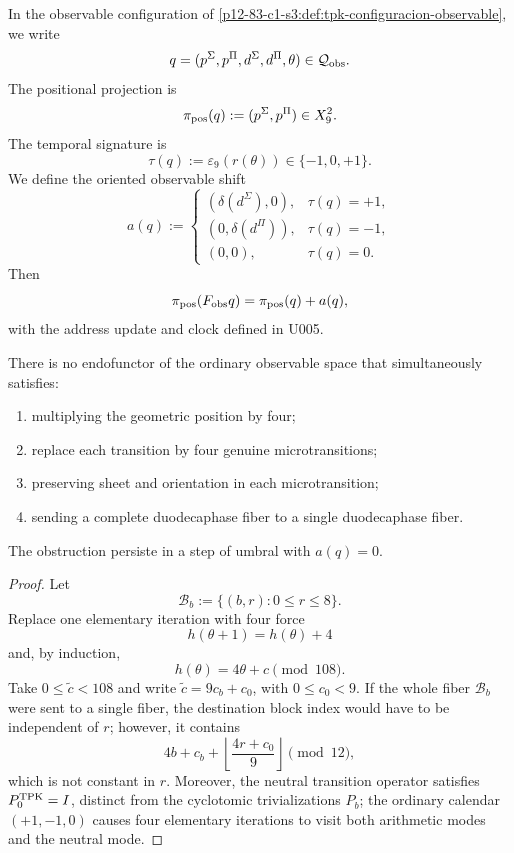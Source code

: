 In the observable configuration of
\cref{p12-83-c1-s3:def:tpk-configuracion-observable}, we write
\[
 q=(p^\Sigma,p^\Pi,d^\Sigma,d^\Pi,\theta)
 \in\mathcal Q_{\rm obs}.
\]
The positional projection is
\begin{equation}
 \pi_{\rm pos}(q):=(p^\Sigma,p^\Pi)\in X_9^2.
 \label{p12-83-c1-s12:eq:u006c-proyeccion-posicional}
\end{equation}
The temporal signature is
\[
 \tau(q):=\varepsilon_9(r(\theta))\in\{-1,0,+1\}.
\]
We define the oriented observable shift
\begin{equation}
 a(q):=
 \begin{cases}
  (\delta(d^\Sigma),0),&\tau(q)=+1,\\
  (0,\delta(d^\Pi)),&\tau(q)=-1,\\
  (0,0),&\tau(q)=0.
 \end{cases}
 \label{p12-83-c1-s12:eq:u006c-desplazamiento-observable}
\end{equation}
Then
\[
 \pi_{\rm pos}(F_{\rm obs}q)=\pi_{\rm pos}(q)+a(q),
\]
with the address update and clock defined in U005.

\begin{theorem}
\label{p12-83-c1-s12:thm:u006c-obstruccion}
There is no endofunctor of the ordinary observable space that simultaneously satisfies:
\begin{enumerate}
 \item multiplying the geometric position by four;
 \item replace each transition by four genuine microtransitions;
 \item preserving sheet and orientation in each microtransition;
 \item sending a complete duodecaphase fiber to a single
 duodecaphase fiber.
\end{enumerate}
The obstruction persiste in a step of umbral with \(a(q)=0\).
\end{theorem}

\begin{proof}
Let
\[
 \mathcal B_b:=\{(b,r):0\leq r\leq8\}.
\]
Replace one elementary iteration with four force
\[
 h(\theta+1)=h(\theta)+4
\]
and, by induction,
\[
 h(\theta)=4\theta+c\pmod{108}.
\]
Take \(0\leq\widetilde c<108\) and write \(\widetilde c=9c_b+c_0\), with \(0\leq c_0<9\). If the whole
fiber \(\mathcal B_b\) were sent to a single fiber, the destination block index
would have to be independent of \(r\); however, it contains
\begin{equation}
 4b+c_b+
 \left\lfloor\frac{4r+c_0}{9}\right\rfloor
 \pmod{12},
 \label{p12-83-c1-s12:eq:u006c-bloque-obstruccion}
\end{equation}
which is not constant in \(r\). Moreover, the neutral transition operator
satisfies \(P_0^{\rm TPK}=I\), distinct from the cyclotomic
trivializations \(P_b\); the ordinary calendar \((+1,-1,0)\) causes
four elementary iterations to visit both arithmetic modes and the
neutral mode.
\end{proof}

